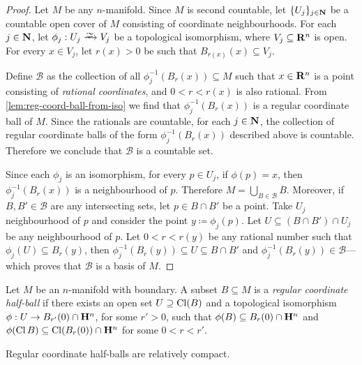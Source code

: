 \begin{proof}
Let \(M\) be any \(n\)-manifold. Since \(M\) is second countable, let
\(\{U_{j}\}_{j \in \mathbf{N}}\) be a countable open cover of \(M\) consisting of
coordinate neighbourhoods. For each \(j \in \mathbf{N}\), let \(\phi_j: U_j \isoto V_j\)
be a topological isomorphism, where \(V_j \subseteq \mathbf{R}^n\) is open. For every
\(x \in V_j\), let \(r(x) > 0\) be such that \(B_{r(x)}(x) \subseteq V_j\).

Define \(\mathcal{B}\) as the collection of all \(\phi_j^{-1}(B_{r}(x))
\subseteq M\) such that \(x \in \mathbf{R}^n\) is a point consisting of \emph{rational
  coordinates}, and \(0 < r < r(x)\) is also rational. From
\cref{lem:reg-coord-ball-from-iso} we find that \(\phi_j^{-1}(B_r(x))\) is a
regular coordinate ball of \(M\). Since the rationals are countable, for each
\(j \in \mathbf{N}\), the collection of regular coordinate balls of the form
\(\phi_j^{-1}(B_r(x))\) described above is countable. Therefore we conclude that
\(\mathcal{B}\) is a countable set.

Since each \(\phi_j\) is an isomorphism, for every \(p \in U_j\), if
\(\phi(p) = x\), then \(\phi_j^{-1}(B_r(x))\) is a neighbourhood of
\(p\). Therefore \(M = \bigcup_{B \in \mathcal{B}} B\). Moreover, if
\(B, B' \in \mathcal{B}\) are any intersecting sets, let \(p \in B \cap B'\) be
a point. Take \(U_j\) neighbourhood of \(p\) and consider the point
\(y \coloneq \phi_j(p)\). Let \(U \subseteq (B \cap B') \cap U_j\) be any
neighbourhood of \(p\). Let \(0 < r < r(y)\) be any rational number such that
\(\phi_j(U) \subseteq B_r(y)\), then
\(\phi_j^{-1}(B_r(y)) \subseteq U \subseteq B \cap B'\) and
\(\phi_j^{-1}(B_r(y)) \in \mathcal{B}\)---which proves that \(\mathcal{B}\) is
a basis of \(M\).
\end{proof}

\begin{definition}
\label{def:reg-coord-half-ball}
Let \(M\) be an \(n\)-manifold with boundary. A subset \(B \subseteq M\) is a
\emph{regular coordinate half-ball} if there exists an open set
\(U \supseteq \operatorname{Cl}(B)\) and a topological isomorphism
\(\phi: U \to B_{r'}(0) \cap \mathbf{H}^n\), for some \(r' > 0\), such that
\(\phi(B) \subseteq B_r(0) \cap \mathbf{H}^n\) and
\(\phi(\operatorname{Cl} B) \subseteq \operatorname{Cl}(B_r(0)) \cap \mathbf{H}^n\) for some \(0 < r < r'\).
\end{definition}

\begin{corollary}
\label{cor:reg-coord-half-balls-are-rel-cpct}
Regular coordinate half-balls are relatively compact.
\end{corollary}

